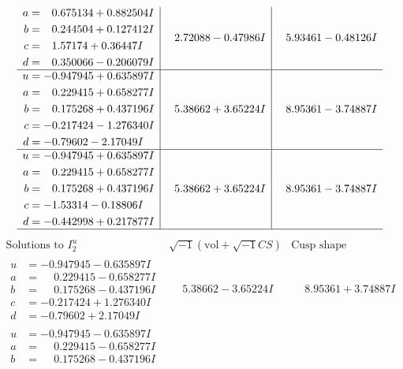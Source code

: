\documentclass[1p]{elsarticle_modified}
\theoremstyle{definition}
\newcommand{\I}{\sqrt{-1}}
\begin{document}
$$\begin{array}{c|c|c}
\begin{aligned}
a &= \phantom{-}0.675134 + 0.882504 I \\
b &= \phantom{-}0.244504 + 0.127412 I \\
c &= \phantom{-}1.57174 + 0.36447 I \\
d &= \phantom{-}0.350066 - 0.206079 I\end{aligned}
 & \phantom{-}2.72088 - 0.47986 I & \phantom{-}5.93461 - 0.48126 I \\ \hline\begin{aligned}
u &= -0.947945 + 0.635897 I \\
a &= \phantom{-}0.229415 + 0.658277 I \\
b &= \phantom{-}0.175268 + 0.437196 I \\
c &= -0.217424 - 1.276340 I \\
d &= -0.79602 - 2.17049 I\end{aligned}
 & \phantom{-}5.38662 + 3.65224 I & \phantom{-}8.95361 - 3.74887 I \\ \hline\begin{aligned}
u &= -0.947945 + 0.635897 I \\
a &= \phantom{-}0.229415 + 0.658277 I \\
b &= \phantom{-}0.175268 + 0.437196 I \\
c &= -1.53314 - 0.18806 I \\
d &= -0.442998 + 0.217877 I\end{aligned}
 & \phantom{-}5.38662 + 3.65224 I & \phantom{-}8.95361 - 3.74887 I\\
 \hline 
 \end{array}$$\newpage$$\begin{array}{c|c|c}  
\text{Solutions to }I^u_{2}& \I (\text{vol} + \sqrt{-1}CS) & \text{Cusp shape}\\
 \hline 
\begin{aligned}
u &= -0.947945 - 0.635897 I \\
a &= \phantom{-}0.229415 - 0.658277 I \\
b &= \phantom{-}0.175268 - 0.437196 I \\
c &= -0.217424 + 1.276340 I \\
d &= -0.79602 + 2.17049 I\end{aligned}
 & \phantom{-}5.38662 - 3.65224 I & \phantom{-}8.95361 + 3.74887 I \\ \hline\begin{aligned}
u &= -0.947945 - 0.635897 I \\
a &= \phantom{-}0.229415 - 0.658277 I \\
b &= \phantom{-}0.175268 - 0.437196 I \\

\end{aligned}
\end{array}$$
\end{document}
